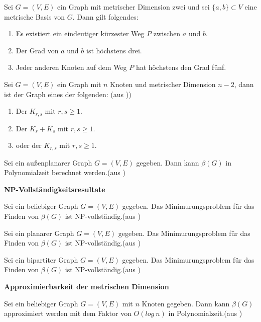 \begin{lem}
Sei $G = (V, E)$ ein Graph mit metrischer Dimension zwei und sei $\{a, b\} \subset V$ eine metrische Basis von $G$. Dann gilt folgendes:
\begin{enumerate}
\item Es existiert ein eindeutiger kürzester Weg $P$ zwischen $a$ und $b$.
\item Der Grad von $a$ und $b$ ist höchstens drei.
\item Jeder anderen Knoten auf dem Weg $P$ hat höchstens den Grad fünf.
\end{enumerate}
\end{lem}
\begin{lem}
Sei $G = (V, E)$ ein Graph mit $n$ Knoten und metrischer Dimension $n-2$, dann ist der Graph eines der folgenden: (aus \cite{Landmarks}))
\begin{enumerate}
\item Der $K_{r,s}$ mit $r,s \geq 1$.
\item Der $K_{r}+ \overline{K_s}$ mit $r,s \geq 1$.
\item oder der $K_{r,s}$ mit $r,s \geq 1$.
\end{enumerate}
\end{lem}
\begin{lem}
Sei ein außenplanarer Graph $G=(V,E)$ gegeben. Dann kann $\beta(G)$ in Polynomialzeit berechnet werden.(aus \cite{On the complexity})
\end{lem}
\textbf{NP-Vollständigkeitsresultate}
\begin{lem}
Sei ein beliebiger Graph $G=(V,E)$ gegeben. Das Minimurungsproblem für das Finden von $\beta(G)$ ist NP-vollständig.(aus \cite{On the complexity})
\end{lem}

\begin{lem}
Sei ein planarer Graph $G=(V,E)$ gegeben. Das Minimurungsproblem für das Finden von $\beta(G)$ ist NP-vollständig.(aus \cite{On the complexity})
\end{lem}

\begin{lem}
Sei ein bipartiter Graph $G=(V,E)$ gegeben. Das Minimurungsproblem für das Finden von $\beta(G)$ ist NP-vollständig.(aus \cite{An efficient representation of Benes networks and its applications})
\end{lem}

\textbf{Approximierbarkeit der metrischen Dimension}
\begin{lem}
Sei ein beliebiger Graph $G=(V,E)$ mit $n$ Knoten gegeben. Dann kann $\beta(G)$ approximiert werden mit dem Faktor von $O(log\:n)$ in Polynomialzeit.(aus \cite{Landmarks})
\end{lem}

